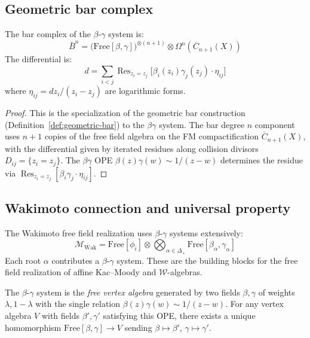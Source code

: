 \subsection{Geometric bar complex}

\begin{theorem}
\label{thm:beta-gamma-bar}
The bar complex of the $\beta$-$\gamma$ system is:
\[
\bar{B}^n = \bigl(\mathrm{Free}[\beta, \gamma]\bigr)^{\otimes (n+1)} \otimes \Omega^n(\overline{C}_{n+1}(X))
\]
The differential is:
\[
d = \sum_{i<j} \operatorname{Res}_{z_i=z_j}\bigl[\beta_i(z_i)\gamma_j(z_j) \cdot \eta_{ij}\bigr]
\]
where $\eta_{ij} = dz_i/(z_i-z_j)$ are logarithmic forms.
\end{theorem}

\begin{proof}
This is the specialization of the geometric bar construction
(Definition~\ref{def:geometric-bar}) to the $\beta\gamma$ system.
The bar degree $n$ component uses $n+1$ copies of the free field algebra
on the FM compactification $\overline{C}_{n+1}(X)$, with the differential
given by iterated residues along collision divisors $D_{ij} = \{z_i = z_j\}$.
The $\beta\gamma$ OPE $\beta(z)\gamma(w) \sim 1/(z-w)$ determines the
residue via $\operatorname{Res}_{z_i = z_j}[\beta_i \gamma_j \cdot \eta_{ij}]$.
\end{proof}

\subsection{Wakimoto connection and universal property}

\begin{remark}
The Wakimoto free field realization uses $\beta$-$\gamma$ systems extensively:
\[
\mathcal{M}_{\mathrm{Wak}} = \mathrm{Free}[\phi_i] \otimes \bigotimes_{\alpha \in \Delta_+} \mathrm{Free}[\beta_\alpha, \gamma_\alpha]
\]
Each root $\alpha$ contributes a $\beta$-$\gamma$ system.  These are the building blocks
for the free field realization of affine Kac--Moody and $\mathcal{W}$-algebras.
\end{remark}

\begin{theorem}
\label{thm:beta-gamma-universal}
The $\beta$-$\gamma$ system is the \emph{free vertex algebra} generated by two fields
$\beta, \gamma$ of weights $\lambda, 1-\lambda$ with the single relation
$\beta(z)\gamma(w) \sim 1/(z-w)$.
For any vertex algebra $V$ with fields $\beta', \gamma'$ satisfying
this OPE, there exists a unique homomorphism
$\mathrm{Free}[\beta, \gamma] \to V$
sending $\beta \mapsto \beta'$, $\gamma \mapsto \gamma'$.
\end{theorem}


